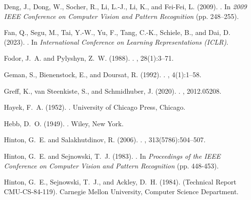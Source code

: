 \documentclass[12pt]{article}
\begin{document}
\begin{thebibliography}{}
Deng, J., Dong, W., Socher, R., Li, L.-J., Li, K., and Fei-Fei, L. (2009).
.
\newblock In {\em 2009 IEEE Conference on Computer Vision and Pattern Recognition} (pp. 248–255).

Fan, Q., Segu, M., Tai, Y.-W., Yu, F., Tang, C.-K., Schiele, B., and Dai, D. (2023).
.
\newblock In {\em International Conference on Learning Representations (ICLR)}.

Fodor, J.~A. and Pylyshyn, Z.~W. (1988).
.
, 28(1):3--71.

Geman, S., Bienenstock, E., and Doursat, R. (1992).
.
, 4(1):1--58.

Greff, K., van Steenkiste, S., and Schmidhuber, J. (2020).
.
, 2012.05208.

Hayek, F.~A. (1952).
.
\newblock University of Chicago Press, Chicago.

Hebb, D.~O. (1949).
.
\newblock Wiley, New York.

Hinton, G.~E. and Salakhutdinov, R. (2006).
.
, 313(5786):504--507.

Hinton, G.~E. and Sejnowski, T.~J. (1983).
.
\newblock In {\em Proceedings of the IEEE Conference on Computer Vision and Pattern Recognition} (pp. 448-453).

Hinton, G.~E., Sejnowski, T.~J., and Ackley, D.~H. (1984).
 (Technical Report CMU-CS-84-119).
\newblock Carnegie Mellon University, Computer Science Department.


\end{thebibliography}
\end{document}

